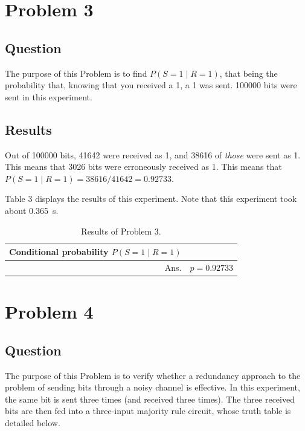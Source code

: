 \documentclass{article}
\begin{document}
\section{Problem 3}
\subsection{Question} The purpose of this Problem is to find
\(P(S = 1 \mid R = 1)\), that being the probability that,
knowing that you received a 1, a 1 was sent. \num{100000}
bits were sent in this experiment.

\subsection{Results} Out of \num{100000} bits, \num{41642}
were received as 1, and \num{38616} of \textit{those}
were sent as 1. This means that \num{3026} bits were
erroneously received as 1. This means that
\(P(S=1\mid R=1) = \num{38616}/\num{41642} = 0.92733\).

Table 3 displays the results of this experiment. Note that this
experiment took about \SI{0.365}{\second}.

\begin{table}[H]
    \centering\begin{tabular}{| r | l |}
        \hline
        Conditional probability \(P(S = 1 \mid R = 1)\) & \\ \hline
        Ans. & \(p = 0.92733\) \\ \hline
    \end{tabular}
    \caption{Results of Problem 3.}
    \label{table:prob3}
\end{table}

\section{Problem 4}
\subsection{Question} The purpose of this Problem is to
verify whether a redundancy approach to the problem of
sending bits through a noisy channel is effective. In this
experiment, the same bit is sent three times (and received
three times). The three received bits are then fed into
a three-input majority rule circuit, whose truth table is
detailed below.
\end{document}
